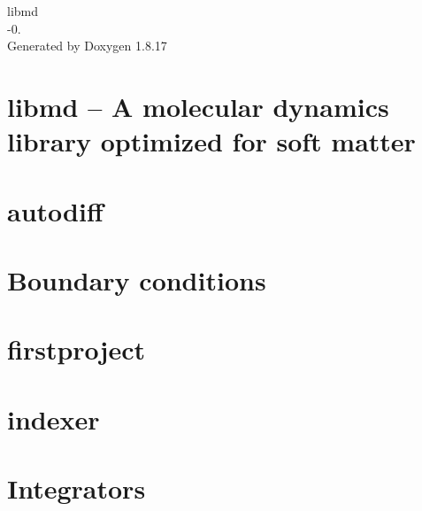 \let\mypdfximage\pdfximage\def\pdfximage{\immediate\mypdfximage}\documentclass[twoside]{book}
\newcommand{\+}{\discretionary{\mbox{\scriptsize$\hookleftarrow$}}{}{}}
\newcommand{\clearemptydoublepage}{%
  \newpage{\pagestyle{empty}\cleardoublepage}%
}
\begin{document}
\hypersetup{pageanchor=false,
             bookmarksnumbered=true,
             pdfencoding=unicode
            }
\begin{titlepage}
\vspace*{7cm}
\begin{center}%
{\Large libmd \\[1ex]\large -\/0. }\\
\vspace*{1cm}
{\large Generated by Doxygen 1.8.17}\\
\end{center}
\end{titlepage}
\clearemptydoublepage
{}
\tableofcontents
\clearemptydoublepage
{}
\hypersetup{pageanchor=true}

\chapter{libmd -- A molecular dynamics library optimized for soft matter}
\label{index}\hypertarget{index}{}
\chapter{autodiff}
\label{md_doc_markdown_autodiff}

\chapter{Boundary conditions}
\label{md_doc_markdown_boundary}

\chapter{firstproject}
\label{md_doc_markdown_firstproject}

\chapter{indexer}
\label{md_doc_markdown_indexer}

\chapter{Integrators}
\label{md_doc_markdown_integrator}

\end{document}
